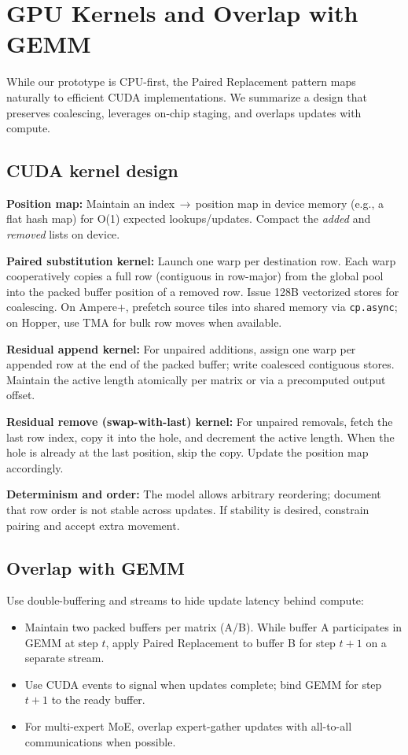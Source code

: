 \documentclass{article}
\numberwithin{equation}{section}
\theoremstyle{plain}
\theoremstyle{definition}
\theoremstyle{remark}
\begin{document}
\section{GPU Kernels and Overlap with GEMM} \label{sec:gpu}

While our prototype is CPU-first, the Paired Replacement pattern maps naturally to efficient CUDA implementations. We summarize a design that preserves coalescing, leverages on-chip staging, and overlaps updates with compute.

\subsection{CUDA kernel design}

\textbf{Position map:} Maintain an index\,$\to$\,position map in device memory (e.g., a flat hash map) for O(1) expected lookups/updates. Compact the \emph{added} and \emph{removed} lists on device.

\textbf{Paired substitution kernel:} Launch one warp per destination row. Each warp cooperatively copies a full row (contiguous in row-major) from the global pool into the packed buffer position of a removed row. Issue 128B vectorized stores for coalescing. On Ampere+, prefetch source tiles into shared memory via \texttt{cp.async}; on Hopper, use TMA for bulk row moves when available.

\textbf{Residual append kernel:} For unpaired additions, assign one warp per appended row at the end of the packed buffer; write coalesced contiguous stores. Maintain the active length atomically per matrix or via a precomputed output offset.

\textbf{Residual remove (swap-with-last) kernel:} For unpaired removals, fetch the last row index, copy it into the hole, and decrement the active length. When the hole is already at the last position, skip the copy. Update the position map accordingly.

\textbf{Determinism and order:} The model allows arbitrary reordering; document that row order is not stable across updates. If stability is desired, constrain pairing and accept extra movement.

\subsection{Overlap with GEMM}

Use double-buffering and streams to hide update latency behind compute:
\begin{itemize}
  \item Maintain two packed buffers per matrix (A/B). While buffer A participates in GEMM at step $t$, apply Paired Replacement to buffer B for step $t{+}1$ on a separate stream.
  \item Use CUDA events to signal when updates complete; bind GEMM for step $t{+}1$ to the ready buffer.
  \item For multi-expert MoE, overlap expert-gather updates with all-to-all communications when possible.
\end{itemize}
\end{document}
